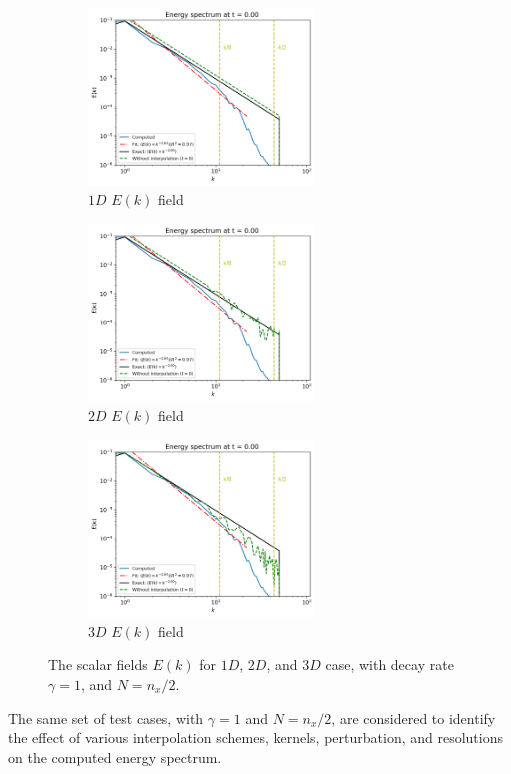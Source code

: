 \begin{figure}[htbp!]
    \begin{subfigure}{7cm}
      \centering\includegraphics[width=6cm]{Code-Figures/sine-vel-prof-1d/ek_00000_loglog.png}
      \caption{$1D$ $E(k)$ field}
    \end{subfigure}
    \begin{subfigure}{7cm}
      \centering\includegraphics[width=6cm]{Code-Figures/sine-vel-prof-2d/ek_00000_loglog.png}
      \caption{$2D$ $E(k)$ field}
    \end{subfigure}
    \begin{subfigure}{7cm}
        \centering\includegraphics[width=6cm]{Code-Figures/sine-vel-prof-3d/ek_00000_loglog.png}
        \caption{$3D$ $E(k)$ field}
      \end{subfigure}
    \caption{The scalar fields $E(k)$ for $1D$, $2D$, and $3D$ case, with decay rate $\gamma=1$, and $N=n_x/2$.}
    \label{fig:espec-scalar-fields-gamma1}
\end{figure}

The same set of test cases, with $\gamma=1$ and $N=n_x/2$, are considered to identify the effect of various interpolation schemes, kernels, perturbation, and resolutions on the computed energy spectrum.

